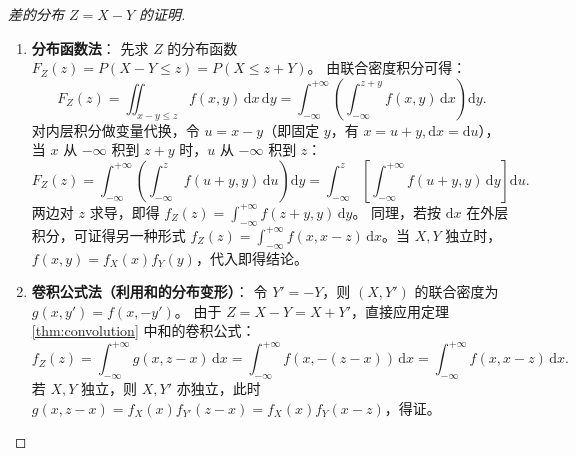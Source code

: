 ﻿\documentclass[lang=cn,11pt]{elegantbook}
\begin{document}
\begin{proof}[差的分布 $Z=X-Y$ 的证明]
\begin{enumerate}
    \item \textbf{分布函数法}：
    先求 $Z$ 的分布函数 $F_Z(z) = P(X-Y \leqslant z) = P(X \leqslant z+Y)$。
    由联合密度积分可得：
    \[
    F_Z(z) = \iint_{x-y \leqslant z} f(x,y)\,\mathrm{d}x\,\mathrm{d}y = \int_{-\infty}^{+\infty} \left( \int_{-\infty}^{z+y} f(x,y)\,\mathrm{d}x \right) \mathrm{d}y.
    \]
    对内层积分做变量代换，令 $u = x-y$（即固定 $y$，有 $x = u+y, \mathrm{d}x = \mathrm{d}u$），当 $x$ 从 $-\infty$ 积到 $z+y$ 时，$u$ 从 $-\infty$ 积到 $z$：
    \[
    F_Z(z) = \int_{-\infty}^{+\infty} \left( \int_{-\infty}^{z} f(u+y, y)\,\mathrm{d}u \right) \mathrm{d}y = \int_{-\infty}^{z} \left[ \int_{-\infty}^{+\infty} f(u+y, y)\,\mathrm{d}y \right] \mathrm{d}u.
    \]
    两边对 $z$ 求导，即得 $f_Z(z) = \displaystyle\int_{-\infty}^{+\infty}f(z+y, y)\,\mathrm{d}y$。
    同理，若按 $\mathrm{d}x$ 在外层积分，可证得另一种形式 $f_Z(z) = \displaystyle\int_{-\infty}^{+\infty}f(x, x-z)\,\mathrm{d}x$。当 $X, Y$ 独立时，$f(x,y)=f_X(x)f_Y(y)$，代入即得结论。

    \item \textbf{卷积公式法（利用和的分布变形）}：
    令 $Y' = -Y$，则 $(X, Y')$ 的联合密度为 $g(x, y') = f(x, -y')$。
    由于 $Z = X - Y = X + Y'$，直接应用定理 \ref{thm:convolution} 中和的卷积公式：
    \[
    f_Z(z) = \int_{-\infty}^{+\infty} g(x, z-x)\,\mathrm{d}x = \int_{-\infty}^{+\infty} f(x, -(z-x))\,\mathrm{d}x = \int_{-\infty}^{+\infty} f(x, x-z)\,\mathrm{d}x.
    \]
    若 $X, Y$ 独立，则 $X, Y'$ 亦独立，此时 $g(x, z-x) = f_X(x)f_{Y'}(z-x) = f_X(x)f_Y(x-z)$，得证。
\end{enumerate}
\end{proof}
\end{document}
